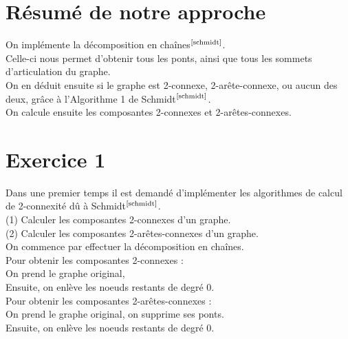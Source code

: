 \documentclass{article}      %
\begin{document}
\section{Résumé de notre approche}
On implémente la décomposition en chaînes$^\text{\cite{schmidt}}$.
\\Celle-ci nous permet d'obtenir tous les ponts, ainsi que tous les sommets d'articulation du graphe.
\\On en déduit ensuite si le graphe est 2-connexe, 2-arête-connexe, ou aucun des deux, grâce à l'Algorithme 1 de Schmidt$^\text{\cite{schmidt}}$.
\\On calcule ensuite les composantes 2-connexes et 2-arêtes-connexes.
%



\section{Exercice 1}
\textcolor{exogris}{
Dans une premier temps il est demandé d’implémenter les algorithmes de calcul de 2-connexité dû à Schmidt$^\text{\cite{schmidt}}$.
\\(1) Calculer les composantes 2-connexes d’un graphe.
\\(2) Calculer les composantes 2-arêtes-connexes d’un graphe.
}
\\On commence par effectuer la décomposition en chaînes.
\\Pour obtenir les composantes 2-connexes :
\\On prend le graphe original, 
\\Ensuite, on enlève les noeuds restants de degré 0.
\\Pour obtenir les composantes 2-arêtes-connexes :
\\On prend le graphe original, on supprime ses ponts.
\\Ensuite, on enlève les noeuds restants de degré 0.
%
\end{document}
